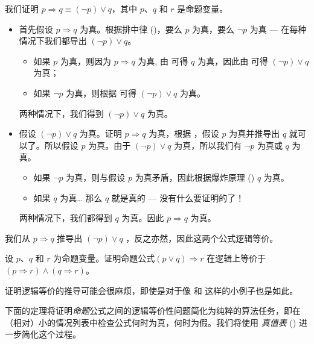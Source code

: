 \begin{example}
\label{exImplicationInTermsOfDisjunction}
我们证明 $p \Rightarrow q \equiv (\neg p) \vee q$，其中 $p$、$q$ 和 $r$ 是命题变量。

\begin{itemize}
\item 首先假设 $p \Rightarrow q$ 为真。根据排中律 ()，要么 $p$ 为真，要么 $\neg p$ 为真 --- 在每种情况下我们都导出 $(\neg p) \vee q$。
\begin{itemize}
\item 如果 $p$ 为真，则因为 $p \Rightarrow q$ 为真, 由 \elimrule{\Rightarrow} 可得 $q$ 为真，因此由  可得 $(\neg p) \vee q$ 为真；
\item 如果 $\neg p$ 为真，则根据  可得 $(\neg p) \vee q$ 为真。
\end{itemize}
两种情况下，我们得到 $(\neg p) \vee q$ 为真。

\item 假设 $(\neg p) \vee q$ 为真。证明 $p \Rightarrow q$ 为真，根据 \introrule{\Rightarrow} ，假设 $p$ 为真并推导出 $q$ 就可以了。所以假设 $p$ 为真。由于 $(\neg p) \vee q$ 为真，所以我们有 $\neg p$ 为真或 $q$ 为真。
\begin{itemize}
\item 如果 $\neg p$ 为真，则与假设 $p$ 为真矛盾，因此根据爆炸原理 () $q$ 为真。
\item 如果 $q$ 为真\dots{} 那么 $q$ 就是真的 --- 没有什么要证明的了！
\end{itemize}
两种情况下，我们都得到 $q$ 为真。因此 $p \Rightarrow q$ 为真。
\end{itemize}

我们从 $p \Rightarrow q$ 推导出 $(\neg p) \vee q$ ，反之亦然，因此这两个公式逻辑等价。
\end{example}

\begin{exercise}
\label{exPAndQImpliesRIffPImpliesRAndQImpliesR}
设 $p$、$q$ 和 $r$ 为命题变量。证明命题公式$(p \vee q) \Rightarrow r$ 在逻辑上等价于 $(p \Rightarrow r) \wedge (q \Rightarrow r)$。
\end{exercise}

证明逻辑等价的推导可能会很麻烦，即使是对于像  和  这样的小例子也是如此。

下面的定理将证明\textit{命题}公式之间的逻辑等价性问题简化为纯粹的算法任务，即在（相对）小的情况列表中检查公式何时为真，何时为假。我们将使用 \textit{真值表} () 进一步简化这个过程。

